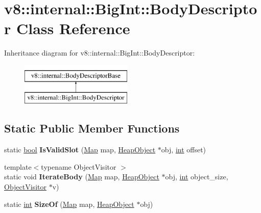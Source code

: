 \hypertarget{classv8_1_1internal_1_1BigInt_1_1BodyDescriptor}{}\section{v8\+:\+:internal\+:\+:Big\+Int\+:\+:Body\+Descriptor Class Reference}
\label{classv8_1_1internal_1_1BigInt_1_1BodyDescriptor}
Inheritance diagram for v8\+:\+:internal\+:\+:Big\+Int\+:\+:Body\+Descriptor\+:\begin{figure}[H]
\begin{center}
\leavevmode
\includegraphics[height=2.000000cm]{classv8_1_1internal_1_1BigInt_1_1BodyDescriptor}
\end{center}
\end{figure}
\subsection*{Static Public Member Functions}
\begin{DoxyCompactItemize}
\item 
\mbox{\label{classv8_1_1internal_1_1BigInt_1_1BodyDescriptor_a96afc21945143e90411a4ec02d56b4e7}} 
static \mbox{\hyperlink{classbool}{bool}} {\bfseries Is\+Valid\+Slot} (\mbox{\hyperlink{classv8_1_1internal_1_1Map}{Map}} map, \mbox{\hyperlink{classv8_1_1internal_1_1HeapObject}{Heap\+Object}} $\ast$obj, \mbox{\hyperlink{classint}{int}} offset)
\item 
\mbox{\label{classv8_1_1internal_1_1BigInt_1_1BodyDescriptor_aea42f15e259ebd38907f1328a96c6a07}} 
{\footnotesize template$<$typename Object\+Visitor $>$ }\\static void {\bfseries Iterate\+Body} (\mbox{\hyperlink{classv8_1_1internal_1_1Map}{Map}} map, \mbox{\hyperlink{classv8_1_1internal_1_1HeapObject}{Heap\+Object}} $\ast$obj, \mbox{\hyperlink{classint}{int}} object\+\_\+size, \mbox{\hyperlink{classv8_1_1internal_1_1ObjectVisitor}{Object\+Visitor}} $\ast$v)
\item 
\mbox{\label{classv8_1_1internal_1_1BigInt_1_1BodyDescriptor_a359de7870ab94aa11f08849af389f361}} 
static \mbox{\hyperlink{classint}{int}} {\bfseries Size\+Of} (\mbox{\hyperlink{classv8_1_1internal_1_1Map}{Map}} map, \mbox{\hyperlink{classv8_1_1internal_1_1HeapObject}{Heap\+Object}} $\ast$obj)
\end{DoxyCompactItemize}
